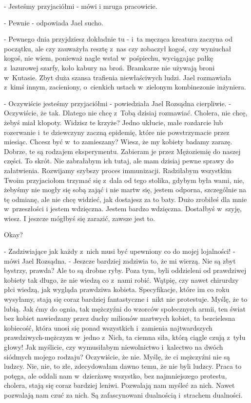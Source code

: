 \documentclass[oneside,polish,12pt,sfheadings]{mwbk}
\begin{document}
- Jesteśmy przyjaciółmi - mówi i
mruga pracowicie.

- Pewnie - odpowiada Jael sucho.

- Pewnego dnia przyjdziesz dokładnie tu - i~ta męcząca kreatura zaczyna
od początku, ale czy zauważyła resztę z~nas czy zobaczył kogoś, czy
wyniuchał kogoś, nie wiem, ponieważ nagle wstał w~pośpiechu, wyciągając
pałkę z~lazurowej szarfy, koło kabury na broń. Bramkarze nie używają
broni w~Kutasie. Zbyt duża szansa trafienia niewłaściwych ludzi. Jael
rozmawiała z~kimś innym, zacieniony, o~cienkich ustach w~zielonym
kombinezonie inżyniera.

- Oczywiście jesteśmy przyjaciółmi - powiedziała Jael Rozsądna cierpliwie.
- Oczywiście, że tak. Dlatego nie chcę z~Tobą dzisiaj rozmawiać. Cholera, nie chcę, żebyś
miał kłopoty. Widzisz te krzyże? Jedno ukłucie, małe rozdarcie lub
rozerwanie i~te dziewczyny zaczną epidemię, które nie powstrzymacie
przez miesiąc. Chcesz być w~to zamieszany? Wiesz, że my kobiety badamy
zarazę. Dobrze, te są rodzajem eksperymentu. Zabieram je przez Mężoziemię
do naszej części. To skrót. Nie zabrałabym ich tutaj, ale mam dzisiaj
pewne sprawy do załatwienia. Rozwijamy szybszy proces immunizacji.
Radziłabym wszystkim Twoim przyjaciołom trzymać się z~dala od tego
stolika, gdybym była wami, nie, żebyśmy nie mogły się sobą zająć i
nie martw się, jestem odporna, szczególnie na tę odmianę, ale nie
chcę widzieć, jak dostajesz za to baty. Dużo zrobiłeś dla mnie w~przeszłości
i jestem wdzięczna. Jestem bardzo wdzięczna. Dostałbyś w~szyję, wiesz.
I jeszcze mógłbyś się zarazić, zawsze jest to.

Okay?

- Zadziwiające jak każdy z~nich musi być upewniony co do mojej lojalności!
- mówi Jael Rozsądna. - Jeszcze bardziej zadziwia to, że mi wierzą.
Nie są zbyt bystrzy, prawda? Ale to są drobne ryby. Poza tym, byli
oddzieleni od prawdziwej kobiety tak długo, że nie wiedzą co z~nami
robić. Wątpię, czy nawet chirurdzy płci wiedzą, jak wygląda prawdziwa
kobieta. Specyfikacje, które im co roku wysyłamy, stają się coraz
bardziej fantastyczne i~nikt nie protestuje. Myślę, że to lubią. Jak
ćmy do ognia, tak mężczyźni do wzorców społecznych armii, ten świat
bez kobiet nawiedzany przez duchy milionów martwych kobiet, ta bezcielesna
kobiecość, która unosi się ponad wszystkich i~zamienia najtwardszych
prawdziwych-mężczyzn w~jedno z~Nich, ta ciemna siła, którą ciągle
czują z~tyłu głowy! Jak myślicie, czy wymusiłabym niewolnictwo i~kalectwo
na dwóch siódmych mojego rodzaju? Oczywiście, że nie. Myślę, że ci
mężczyźni nie są ludzcy. Nie, nie, to złe, zdecydowałam dawno temu,
że nie byli ludzcy. Praca to potęga, ale oddali nam w~dzierżawę wszystko,
bez najmniejszego protestu, cholera, stają się coraz bardziej leniwi.
Pozwalają nam myśleć za nich. Nawet pozwalają nam czuć za nich. Są
zafascynowani dualnością i~strachem dualności.
\end{document}
